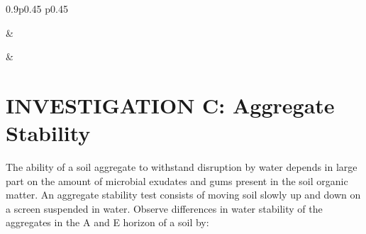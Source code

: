 \documentclass[
  letterpaper,
  twocolumn,
  portrait]{scrbook}
\begin{document}
\begin{table}[h!]
\begin{centerbox}
\begin{threeparttable}
 
\setlength{\tabcolsep}{0pt}
\begin{tabularx}{0.9\textwidth}{p{} p{}}



 &
 \tabularnewline[-0.5pt]



 &
 \tabularnewline[-0.5pt]


\end{tabularx}
\end{threeparttable}\par\end{centerbox}

\end{table}
 

\hypertarget{investigation-c-aggregate-stability}{%
\section{INVESTIGATION C: Aggregate
Stability}\label{investigation-c-aggregate-stability}}

The ability of a soil aggregate to withstand disruption by water depends
in large part on the amount of microbial exudates and gums present in
the soil organic matter. An aggregate stability test consists of moving
soil slowly up and down on a screen suspended in water. Observe
differences in water stability of the aggregates in the A and E horizon
of a soil by:
\end{document}
